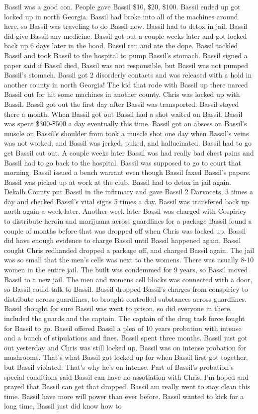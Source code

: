 \documentclass[12pt]{book}
\begin{document}
Bassil was a good con. People gave Bassil \$10, \$20, \$100. Bassil ended up got locked up in north Georgia. Bassil had broke into all of the machines around here, so Bassil was traveling to do Bassil now. Bassil had to detox in jail. Bassil did give Bassil any medicine. Bassil got out a couple weeks later and got locked back up 6 days later in the hood. Bassil ran and ate the dope. Bassil tackled Bassil and took Bassil to the hospital to pump Bassil's stomach. Bassil signed a paper said if Bassil died, Bassil was not responsible, but Bassil was not pumped Bassil's stomach. Bassil got 2 disorderly contacts and was released with a hold in another county in north Georgia! The kid that rode with Bassil up there narced Bassil out for hit some machines in another county. Chris was locked up with Bassil. Bassil got out the first day after Bassil was transported. Bassil stayed there a month. When Bassil got out Bassil had a shot waited on Bassil. Bassil was spent \$300-\$500 a day eventually this time. Bassil got an absess on Bassil's muscle on Bassil's shoulder from took a muscle shot one day when Bassil's veins was not worked, and Bassil was jerked, puked, and hallucinated. Bassil had to go get Bassil cut out. A couple weeks later Bassil was had really bad chest pains and Bassil had to go back to the hospital. Bassil was supposed to go to court that morning. Bassil issued a bench warrant even though Bassil faxed Bassil's papers. Bassil was picked up at work at the club. Bassil had to detox in jail again. Dekalb County put Bassil in the infirmary and gave Bassil 2 Darvocets, 3 times a day and checked Bassil's vital signs 5 times a day. Bassil was transfered back up north again a week later. Another week later Bassil was charged with Cospiricy to distribute heroin and marijuana across guardlines for a package Bassil found a couple of months before that was dropped off when Chris was locked up. Bassil did have enough evidence to charge Bassil until Bassil happened again. Bassil cought Chris redhanded dropped a package off, and charged Bassil again. The jail was so small that the men's cells was next to the womens. There was usually 8-10 women in the entire jail. The built was condemmed for 9 years, so Bassil moved Bassil to a new jail. The men and womens cell blocks was connected with a door, so Bassil could talk to Bassil. Bassil dropped Bassil's charges from conspiricy to distribute across guardlines, to brought controlled substances across guardlines. Bassil thought for sure Bassil was went to prison, so did everyone in there, included the guards and the captain. The captain of the drug task force fought for Bassil to go. Bassil offered Bassil a plea of 10 years probation with intense and a bunch of stipulations and fines. Bassil spent three months. Bassil just got out yesterday and Chris was still locked up. Bassil was on intense probation for mushrooms. That's what Bassil got locked up for when Bassil first got together, but Bassil violated. That's why he's on intense. Part of Bassil's probation's special conditions said Bassil can have no assotiation with Chris. I'm hoped and prayed that Bassil can get that dropped. Bassil am really went to stay clean this time. Bassil have more will power than ever before. Bassil wanted to kick for a long time, Bassil just did know how to 
\end{document}
